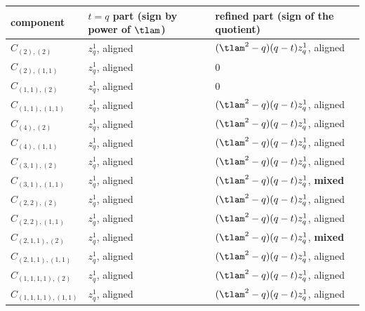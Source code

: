 \begin{center}
\begin{tabular}{lll}
\toprule
component & $t = q$ part (sign by power of $\tlam$) & refined part (sign of the quotient) \\
\midrule
$\hat C_{(2),(2)}$ & $z_q^{1}$, aligned & $(\tlam^2 - q)(q - t) z_q^{1}$, aligned \\
$\hat C_{(2),(1,1)}$ & $z_q^{1}$, aligned & 0 \\
$\hat C_{(1,1),(2)}$ & $z_q^{1}$, aligned & 0 \\
$\hat C_{(1,1),(1,1)}$ & $z_q^{1}$, aligned & $(\tlam^2 - q)(q - t) z_q^{1}$, aligned \\
$\hat C_{(4),(2)}$ & $z_q^{1}$, aligned & $(\tlam^2 - q)(q - t) z_q^{1}$, aligned \\
$\hat C_{(4),(1,1)}$ & $z_q^{1}$, aligned & $(\tlam^2 - q)(q - t) z_q^{1}$, aligned \\
$\hat C_{(3,1),(2)}$ & $z_q^{1}$, aligned & $(\tlam^2 - q)(q - t) z_q^{1}$, aligned \\
$\hat C_{(3,1),(1,1)}$ & $z_q^{1}$, aligned & $(\tlam^2 - q)(q - t) z_q^{1}$, \textbf{mixed} \\
$\hat C_{(2,2),(2)}$ & $z_q^{1}$, aligned & $(\tlam^2 - q)(q - t) z_q^{1}$, aligned \\
$\hat C_{(2,2),(1,1)}$ & $z_q^{1}$, aligned & $(\tlam^2 - q)(q - t) z_q^{1}$, aligned \\
$\hat C_{(2,1,1),(2)}$ & $z_q^{1}$, aligned & $(\tlam^2 - q)(q - t) z_q^{1}$, \textbf{mixed} \\
$\hat C_{(2,1,1),(1,1)}$ & $z_q^{1}$, aligned & $(\tlam^2 - q)(q - t) z_q^{1}$, aligned \\
$\hat C_{(1,1,1,1),(2)}$ & $z_q^{1}$, aligned & $(\tlam^2 - q)(q - t) z_q^{1}$, aligned \\
$\hat C_{(1,1,1,1),(1,1)}$ & $z_q^{1}$, aligned & $(\tlam^2 - q)(q - t) z_q^{1}$, aligned \\
\bottomrule
\end{tabular}
\end{center}
